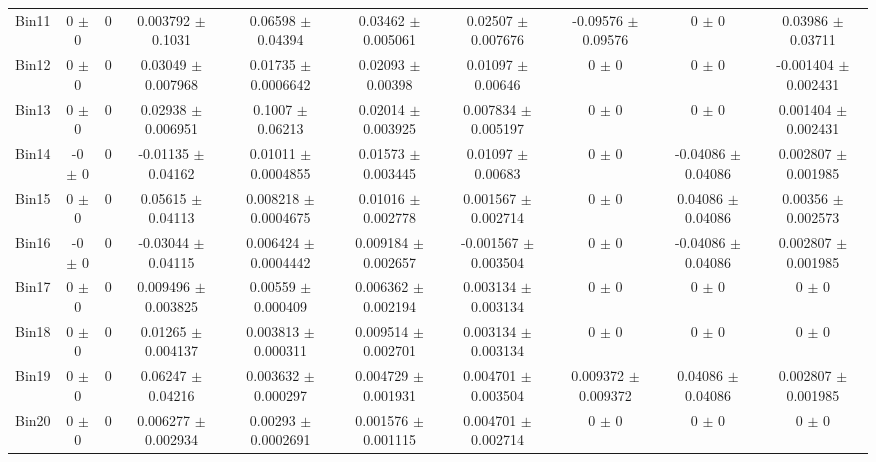 \begin{tabular}{@{\extracolsep{4pt}}lccccccccc@{}}
     Bin11 & 0 $\pm$ 0 & 0 & 0.003792 $\pm$ 0.1031 & 0.06598 $\pm$ 0.04394 & 0.03462 $\pm$ 0.005061 & 0.02507 $\pm$ 0.007676 & -0.09576 $\pm$ 0.09576 & 0 $\pm$ 0 & 0.03986 $\pm$ 0.03711 \\ 
     Bin12 & 0 $\pm$ 0 & 0 & 0.03049 $\pm$ 0.007968 & 0.01735 $\pm$ 0.0006642 & 0.02093 $\pm$ 0.00398 & 0.01097 $\pm$ 0.00646 & 0 $\pm$ 0 & 0 $\pm$ 0 & -0.001404 $\pm$ 0.002431 \\ 
     Bin13 & 0 $\pm$ 0 & 0 & 0.02938 $\pm$ 0.006951 & 0.1007 $\pm$ 0.06213 & 0.02014 $\pm$ 0.003925 & 0.007834 $\pm$ 0.005197 & 0 $\pm$ 0 & 0 $\pm$ 0 & 0.001404 $\pm$ 0.002431 \\ 
     Bin14 & -0 $\pm$ 0 & 0 & -0.01135 $\pm$ 0.04162 & 0.01011 $\pm$ 0.0004855 & 0.01573 $\pm$ 0.003445 & 0.01097 $\pm$ 0.00683 & 0 $\pm$ 0 & -0.04086 $\pm$ 0.04086 & 0.002807 $\pm$ 0.001985 \\ 
     Bin15 & 0 $\pm$ 0 & 0 & 0.05615 $\pm$ 0.04113 & 0.008218 $\pm$ 0.0004675 & 0.01016 $\pm$ 0.002778 & 0.001567 $\pm$ 0.002714 & 0 $\pm$ 0 & 0.04086 $\pm$ 0.04086 & 0.00356 $\pm$ 0.002573 \\ 
     Bin16 & -0 $\pm$ 0 & 0 & -0.03044 $\pm$ 0.04115 & 0.006424 $\pm$ 0.0004442 & 0.009184 $\pm$ 0.002657 & -0.001567 $\pm$ 0.003504 & 0 $\pm$ 0 & -0.04086 $\pm$ 0.04086 & 0.002807 $\pm$ 0.001985 \\ 
     Bin17 & 0 $\pm$ 0 & 0 & 0.009496 $\pm$ 0.003825 & 0.00559 $\pm$ 0.000409 & 0.006362 $\pm$ 0.002194 & 0.003134 $\pm$ 0.003134 & 0 $\pm$ 0 & 0 $\pm$ 0 & 0 $\pm$ 0 \\ 
     Bin18 & 0 $\pm$ 0 & 0 & 0.01265 $\pm$ 0.004137 & 0.003813 $\pm$ 0.000311 & 0.009514 $\pm$ 0.002701 & 0.003134 $\pm$ 0.003134 & 0 $\pm$ 0 & 0 $\pm$ 0 & 0 $\pm$ 0 \\ 
     Bin19 & 0 $\pm$ 0 & 0 & 0.06247 $\pm$ 0.04216 & 0.003632 $\pm$ 0.000297 & 0.004729 $\pm$ 0.001931 & 0.004701 $\pm$ 0.003504 & 0.009372 $\pm$ 0.009372 & 0.04086 $\pm$ 0.04086 & 0.002807 $\pm$ 0.001985 \\ 
     Bin20 & 0 $\pm$ 0 & 0 & 0.006277 $\pm$ 0.002934 & 0.00293 $\pm$ 0.0002691 & 0.001576 $\pm$ 0.001115 & 0.004701 $\pm$ 0.002714 & 0 $\pm$ 0 & 0 $\pm$ 0 & 0 $\pm$ 0 \\ 
\hline\hline
  \end{tabular}
